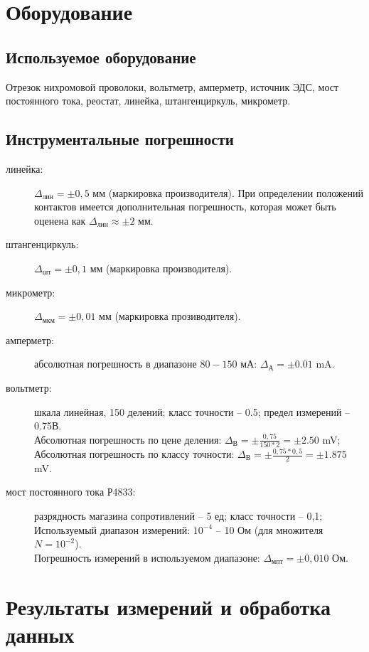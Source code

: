 \documentclass[a4paper]{article}
\begin{document}
\section{Оборудование}
\subsection{Используемое оборудование}
Отрезок нихромовой проволоки, вольтметр, амперметр, источник ЭДС, мост постоянного тока, реостат, линейка, штангенциркуль, микрометр.
\subsection{Инструментальные погрешности}
\vspace{0.15 cm}

\begin{description}
    \item[линейка:] $\Delta_\text{лин}=\pm0,5$ мм (маркировка производителя). 
    При определении положений контактов имеется дополнительная погрешность, которая может быть оценена как $\Delta_\text{лин} \approx \pm 2$ мм.
    \item[штангенциркуль:] $\Delta_\text{шт}=\pm0,1$ мм (маркировка производителя).
    \item[микрометр:] $\Delta_\text{мкм}=\pm0,01$ мм (маркировка прозиводителя).
    \item[амперметр:] абсолютная погрешность в диапазоне $80-150$ мА: $\Delta_\text{А} = \pm 0.01$ mA.

    \item[вольтметр:] шкала линейная, 150 делений; класс точности -- 0.5; предел измерений -- 0.75В. 
    \\ Абсолютная погрешность по цене деления: $\Delta_\text{В} = \pm \frac{0,75}{150*2} = \pm 2.50$ mV;
    \\ Абсолютная погрешность по классу точности: $\Delta_\text{В} =\pm \frac{0,75*0,5}{2} = \pm 1.875$ mV.

    \item[мост постоянного тока Р4833:] разрядность магазина сопротивлений -- 5 ед; класс точности -- 0,1; 
    \\ Используемый диапазон измерений: $10^{-4}$ – 10 Ом (для множителя $N = 10^{-2}$). \\
    Погрешность измерений в используемом диапазоне: $\Delta_\text{мпт} =\pm0,010$ Ом.
\end{description}

\section{Результаты измерений и обработка данных}
\end{document}
